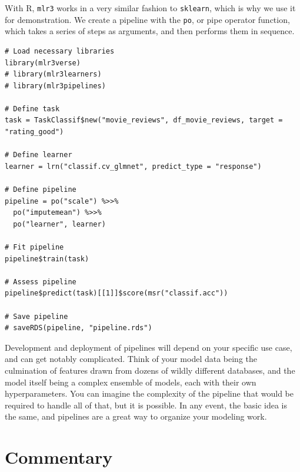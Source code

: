 \documentclass[
  letterpaper,
]{krantz}
\begin{document}
With R, \texttt{mlr3} works in a very similar fashion to
\texttt{sklearn}, which is why we use it for demonstration. We create a
pipeline with the \texttt{po}, or pipe operator function, which takes a
series of steps as arguments, and then performs them in sequence.

\begin{verbatim}
# Load necessary libraries
library(mlr3verse)
# library(mlr3learners)
# library(mlr3pipelines)

# Define task
task = TaskClassif$new("movie_reviews", df_movie_reviews, target = "rating_good")

# Define learner
learner = lrn("classif.cv_glmnet", predict_type = "response")

# Define pipeline
pipeline = po("scale") %>>%
  po("imputemean") %>>%
  po("learner", learner)

# Fit pipeline
pipeline$train(task)

# Assess pipeline
pipeline$predict(task)[[1]]$score(msr("classif.acc"))

# Save pipeline
# saveRDS(pipeline, "pipeline.rds")
\end{verbatim}

Development and deployment of pipelines will depend on your specific use
case, and can get notably complicated. Think of your model data being
the culmination of features drawn from dozens of wildly different
databases, and the model itself being a complex ensemble of models, each
with their own hyperparameters. You can imagine the complexity of the
pipeline that would be required to handle all of that, but it is
possible. In any event, the basic idea is the same, and pipelines are a
great way to organize your modeling work.

\section{Commentary}\label{commentary}
\end{document}
